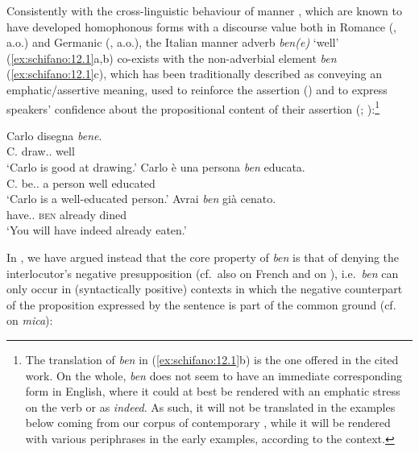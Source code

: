 \documentclass[output=paper]{langsci/langscibook}
\begin{document}
Consistently with the cross-linguistic behaviour of manner , which are
known to have developed  homophonous forms with a discourse value both in
Romance (\citealt{Belletti1990,Belletti1994,Lonzi1991,Cinque1976,Cinque1999,%
Vinet1996,WalDet2007,Coniglio2008,Hernanz2010,Cardinaletti2011,PadPen2014},
a.o.) and Germanic (\citealt{Weydt1969,Baardewyk-Resseguier1991}, a.o.), the
Italian manner adverb \emph{ben(e)} ‘well’ (\ref{ex:schifano:12.1}a,b) co-exists with the
non-adverbial element \emph{ben} (\ref{ex:schifano:12.1}c), which has been traditionally described
as conveying an em\-phat\-ic/as\-sertive meaning, used to
reinforce the assertion (\citealt{Belletti1990,Belletti1994,Lonzi1991}) and
to express speakers’ confidence about the propositional content of their
assertion (\citealt{Coniglio2008}; \citealt{Cardinaletti2011}):\footnote{The
    translation of \emph{ben} in (\ref{ex:schifano:12.1}b) is the one offered in the cited work. On
    the whole, \emph{ben} does not seem to have an immediate corresponding form
    in English, where it could at best be rendered with an emphatic stress on
    the verb or as \emph{indeed}. As such, it will not be translated in the
examples below coming from our corpus of contemporary , while it will be
rendered with various periphrases in the early examples, according to the
context.}

\ea\label{ex:schifano:12.1}  \parencite[171, fn.\ 20]{Cinque1999}
	\ea
		\gll    Carlo disegna \textit{bene}.\\
			    C.  draw.\Prs{}.\Tsg{}  well\\
        \glt    \enquote*{Carlo is good at drawing.}
	\ex
		\gll    Carlo è una persona \textit{ben} educata.\\
			    C.  be.\Prs.\Tsg{} a person well  educated\\
        \glt    \enquote*{Carlo is a well-educated person.}
    \ex
		\gll    Avrai \textit{ben} già cenato.\\
			    have.\Fut{}.\Ssg{} \textsc{ben} already dined\\
        \glt    \enquote*{You will have indeed already eaten.}
	\z
\z

In \textcite{CognSchi2018b,CognSchi2018}, we have argued instead that the core
property of  \emph{ben} is that of denying the interlocutor’s negative
presupposition (cf.\ also \citealt{WalDet2007} on French and
\citealt{Hernanz2010} on ), i.e.\ \emph{ben} can only occur in
(syntactically positive) contexts in which the negative counterpart of the
proposition expressed by the sentence is part of the common ground (cf.\
\citealt{Cinque1976} on \emph{mica}):
\end{document}
